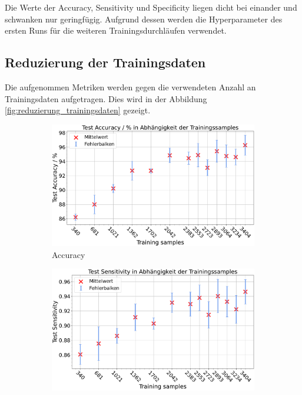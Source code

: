 Die Werte der Accuracy, Sensitivity und Specificity liegen dicht bei einander und schwanken nur geringfügig.
Aufgrund dessen werden die Hyperparameter des ersten Runs für die weiteren Trainingsdurchläufen verwendet.

\subsection{Reduzierung der Trainingsdaten}

Die aufgenommen Metriken werden gegen die verwendeten Anzahl an Trainingsdaten aufgetragen. 
Dies wird in der Abbildung \ref{fig:reduzierung_trainingsdaten} gezeigt.
\begin{figure}[htbp]
  \centering
  \begin{subfigure}[b]{0.48\textwidth}
    \includegraphics[width=\textwidth]{plots/2-Messungen-noTu-Tu_Accuracy_mean.pdf}
    \caption{Accuracy}
    \label{fig:reduzierung_accuracy}
  \end{subfigure}
  \begin{subfigure}[b]{0.48\textwidth}
    \includegraphics[width=\textwidth]{plots/2-Messungen-noTu-Tu_Sensitivity_mean.pdf}

\end{subfigure}
\end{figure}
